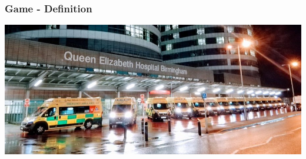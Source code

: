 \begin{frame}
    \frametitle{Game - Definition}

    \includegraphics[scale=0.45]{Bin/ambulance_queue.jpg}

\end{frame}

